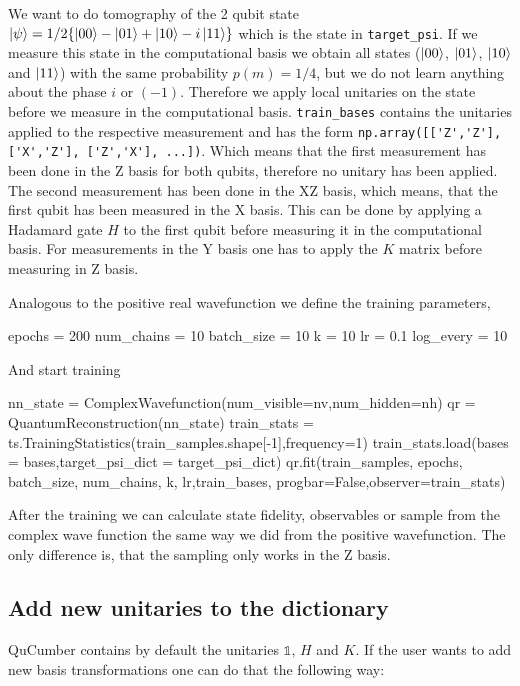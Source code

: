 \documentclass[submission, Phys]{SciPost}
\begin{document}
We want to do tomography of the 2 qubit state $\ket{\psi} = 1/2 \{ \ket{00} - \ket{01} + \ket{10} - i \ket{11} \}$ which is the state in \verb|target_psi|. If we measure this state in the computational basis we obtain all states ($\ket{00}$, $\ket{01}$, $\ket{10}$ and $\ket{11}$) with the same probability $p(m) = 1/4$, but we do not learn anything about the phase $i$ or $(-1)$. Therefore we apply local unitaries on the state before we measure in the computational basis. \verb|train_bases| contains the unitaries applied to the respective measurement and has the form  \verb|np.array([['Z','Z'], ['X','Z'], ['Z','X'], ...])|. Which means that the first measurement has been done in the Z basis for both qubits, therefore no unitary has been applied. The second measurement has been done in the XZ basis, which means, that the first qubit has been measured in the X basis. This can be done by applying a Hadamard gate $H$ to the first qubit before measuring it in the computational basis. For measurements in the Y basis one has to apply the $K$ matrix before measuring in Z basis.

Analogous to the positive real wavefunction we define the training parameters,

\begin{python}
epochs     = 200
num_chains = 10
batch_size = 10
k          = 10
lr         = 0.1
log_every  = 10
\end{python}

And start training

\begin{python}
nn_state = ComplexWavefunction(num_visible=nv,num_hidden=nh)
qr = QuantumReconstruction(nn_state)
train_stats = ts.TrainingStatistics(train_samples.shape[-1],frequency=1)
train_stats.load(bases = bases,target_psi_dict = target_psi_dict)
qr.fit(train_samples, epochs, batch_size, num_chains, k,
       lr,train_bases, progbar=False,observer=train_stats)
\end{python}

After the training we can calculate state fidelity, observables or sample from the complex wave function the same way we did from the positive wavefunction. The only difference is, that the sampling only works in the Z basis.

\subsection{Add new unitaries to the dictionary}

QuCumber contains by default the unitaries $\mathds{1}$, $H$ and $K$. If the user wants to add new basis transformations one can do that the following way:
\end{document}
